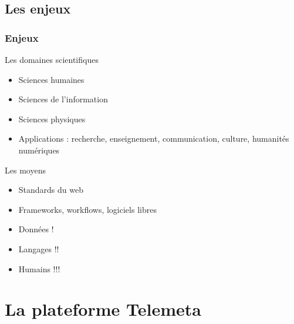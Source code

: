 \documentclass[final, hyperref, table]{beamer}
\begin{document}
\subsection{Les enjeux}
\begin{frame}\frametitle{Enjeux}

\begin{block}{Les domaines scientifiques}
   \begin{itemize}
   \item Sciences humaines
   \item Sciences de l'information
   \item Sciences physiques
   \item Applications : recherche, enseignement, communication, culture, humanités numériques
   \end{itemize}
\end{block}

\begin{block}{Les moyens}
   \begin{itemize}
   \item Standards du web
   \item Frameworks, workflows, logiciels libres
   \item Données !
   \item Langages !!
   \item Humains !!!
   \end{itemize}
\end{block}

\end{frame}


\section[Telemeta]{La plateforme Telemeta}\label{sec:Telemeta}
\end{document}
